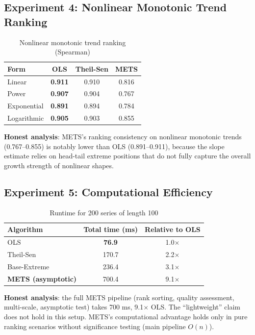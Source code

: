 \documentclass[11pt]{article}
\begin{document}
\subsection{Experiment 4: Nonlinear Monotonic Trend Ranking}
\begin{table}[htbp]
\centering
\caption{Nonlinear monotonic trend ranking (Spearman)}
\label{tab:nonlinear}
\begin{tabular}{lccc}
\toprule
Form & OLS & Theil-Sen & METS \\
\midrule
Linear & \textbf{0.911} & 0.910 & 0.816 \\
Power & \textbf{0.907} & 0.904 & 0.767 \\
Exponential & \textbf{0.891} & 0.894 & 0.784 \\
Logarithmic & \textbf{0.905} & 0.903 & 0.855 \\
\bottomrule
\end{tabular}
\end{table}

\textbf{Honest analysis}: METS's ranking consistency on nonlinear monotonic trends (0.767--0.855) is notably lower than OLS (0.891--0.911), because the slope estimate relies on head-tail extreme positions that do not fully capture the overall growth strength of nonlinear shapes.

\subsection{Experiment 5: Computational Efficiency}
\begin{table}[htbp]
\centering
\caption{Runtime for 200 series of length 100}
\label{tab:runtime}
\begin{tabular}{lcc}
\toprule
Algorithm & Total time (ms) & Relative to OLS \\
\midrule
OLS & \textbf{76.9} & 1.0$\times$ \\
Theil-Sen & 170.7 & 2.2$\times$ \\
Base-Extreme & 236.4 & 3.1$\times$ \\
\textbf{METS (asymptotic)} & 700.4 & 9.1$\times$ \\
\bottomrule
\end{tabular}
\end{table}

\textbf{Honest analysis}: the full METS pipeline (rank sorting, quality assessment, multi-scale, asymptotic test) takes 700 ms, 9.1$\times$ OLS. The ``lightweight'' claim does not hold in this setup. METS's computational advantage holds only in pure ranking scenarios without significance testing (main pipeline $O(n)$).
\end{document}
